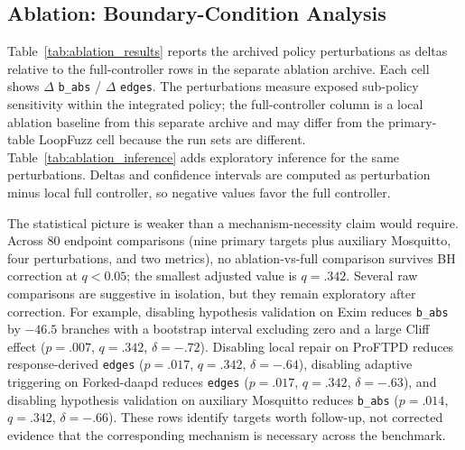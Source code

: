 \documentclass[final,5p,times,number]{elsarticle}
\begin{document}
\subsection{Ablation: Boundary-Condition Analysis}

Table~\ref{tab:ablation_results} reports the archived policy perturbations as deltas relative to the full-controller rows in the separate ablation archive. Each cell shows $\Delta$ \texttt{b\_abs} / $\Delta$ \texttt{edges}. The perturbations measure exposed sub-policy sensitivity within the integrated policy; the full-controller column is a local ablation baseline from this separate archive and may differ from the primary-table LoopFuzz cell because the run sets are different. Table~\ref{tab:ablation_inference} adds exploratory inference for the same perturbations. Deltas and confidence intervals are computed as perturbation minus local full controller, so negative values favor the full controller.

The statistical picture is weaker than a mechanism-necessity claim would require. Across 80 endpoint comparisons (nine primary targets plus auxiliary Mosquitto, four perturbations, and two metrics), no ablation-vs-full comparison survives BH correction at $q<0.05$; the smallest adjusted value is $q=.342$. Several raw comparisons are suggestive in isolation, but they remain exploratory after correction. For example, disabling hypothesis validation on Exim reduces \texttt{b\_abs} by $-46.5$ branches with a bootstrap interval excluding zero and a large Cliff effect ($p=.007$, $q=.342$, $\delta=-.72$). Disabling local repair on ProFTPD reduces response-derived \texttt{edges} ($p=.017$, $q=.342$, $\delta=-.64$), disabling adaptive triggering on Forked-daapd reduces \texttt{edges} ($p=.017$, $q=.342$, $\delta=-.63$), and disabling hypothesis validation on auxiliary Mosquitto reduces \texttt{b\_abs} ($p=.014$, $q=.342$, $\delta=-.66$). These rows identify targets worth follow-up, not corrected evidence that the corresponding mechanism is necessary across the benchmark.
\end{document}
